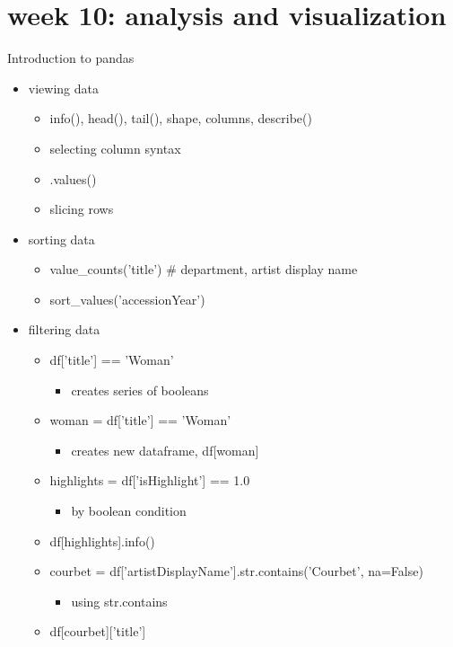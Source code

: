 \documentclass[11pt]{article}
\author{fcalado}
\date{\today}
\title{}
\begin{document}
\tableofcontents

\section{week 10: analysis and visualization}
\label{sec:orgb0e0bf3}

Introduction to pandas
\begin{itemize}
\item viewing data
\begin{itemize}
\item info(), head(), tail(), shape, columns, describe()
\item selecting column syntax
\item .values()
\item slicing rows
\end{itemize}
\item sorting data
\begin{itemize}
\item value\_counts('title') \# department, artist display name
\item sort\_values('accessionYear')
\end{itemize}
\item filtering data
\begin{itemize}
\item df['title'] == 'Woman'
\begin{itemize}
\item creates series of booleans
\end{itemize}
\item woman = df['title'] == 'Woman'
\begin{itemize}
\item creates new dataframe, df[woman]
\end{itemize}
\item highlights = df['isHighlight'] == 1.0
\begin{itemize}
\item by boolean condition
\end{itemize}
\item df[highlights].info()
\item courbet = df['artistDisplayName'].str.contains('Courbet',
na=False)
\begin{itemize}
\item using str.contains
\end{itemize}
\item df[courbet]['title']
\end{itemize}
\end{itemize}
\end{document}
